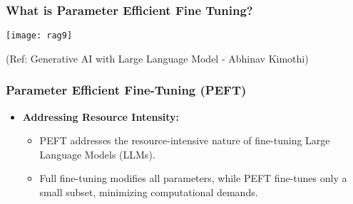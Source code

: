 \begin{frame}[fragile]\frametitle{What is Parameter Efficient Fine Tuning?}


		\begin{center}
		\texttt{[image: rag9]}
		\end{center}

{\tiny (Ref: Generative AI with Large Language Model - Abhinav  Kimothi)}

\end{frame}

\begin{frame}[fragile]\frametitle{Parameter Efficient Fine-Tuning (PEFT)}
  \begin{itemize}
    \item \textbf{Addressing Resource Intensity:}
      \begin{itemize}
        \item PEFT addresses the resource-intensive nature of fine-tuning Large Language Models (LLMs).
        \item Full fine-tuning modifies all parameters, while PEFT fine-tunes only a small subset, minimizing computational demands.
      \end{itemize}
  \end{itemize}
\end{frame}

